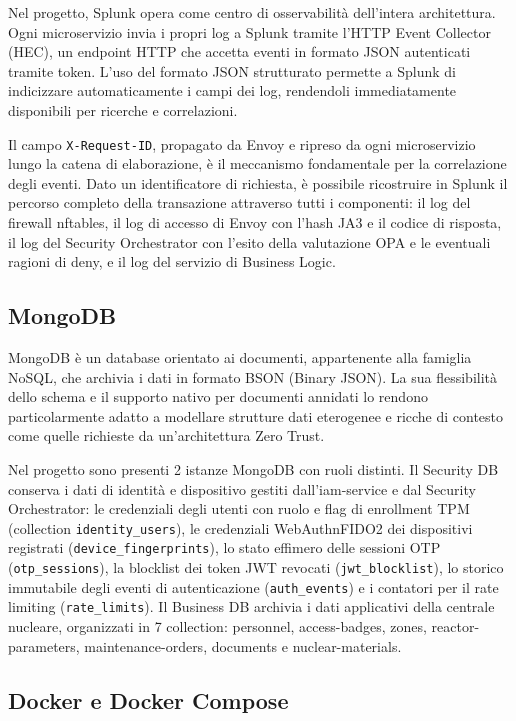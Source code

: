 Nel progetto, Splunk opera come centro di osservabilità dell'intera architettura. Ogni microservizio invia i propri log a Splunk tramite l'HTTP Event Collector (HEC), un endpoint HTTP che accetta eventi in formato JSON autenticati tramite token. L'uso del formato JSON strutturato permette a Splunk di indicizzare automaticamente i campi dei log, rendendoli immediatamente disponibili per ricerche e correlazioni.

Il campo \texttt{X-Request-ID}, propagato da Envoy e ripreso da ogni microservizio lungo la catena di elaborazione, è il meccanismo fondamentale per la correlazione degli eventi. Dato un identificatore di richiesta, è possibile ricostruire in Splunk il percorso completo della transazione attraverso tutti i componenti: il log del firewall nftables, il log di accesso di Envoy con l'hash JA3 e il codice di risposta, il log del Security Orchestrator con l'esito della valutazione OPA e le eventuali ragioni di deny, e il log del servizio di Business Logic.

\subsection{MongoDB}

MongoDB è un database orientato ai documenti, appartenente alla famiglia NoSQL, che archivia i dati in formato BSON (Binary JSON). La sua flessibilità dello schema e il supporto nativo per documenti annidati lo rendono particolarmente adatto a modellare strutture dati eterogenee e ricche di contesto come quelle richieste da un'architettura Zero Trust.

Nel progetto sono presenti 2 istanze MongoDB con ruoli distinti. Il Security DB conserva i
  dati di identità e dispositivo gestiti dall'iam-service e dal Security Orchestrator: le
  credenziali degli utenti con ruolo e flag di enrollment TPM (collection
  \texttt{identity\_users}), le credenziali WebAuthn\/FIDO2 dei dispositivi registrati
  (\texttt{device\_fingerprints}), lo stato effimero delle sessioni OTP
  (\texttt{otp\_sessions}), la blocklist dei token JWT revocati (\texttt{jwt\_blocklist}), lo
  storico immutabile degli eventi di autenticazione (\texttt{auth\_events}) e i contatori per il
  rate limiting (\texttt{rate\_limits}). Il Business DB archivia i dati applicativi della
  centrale nucleare, organizzati in 7 collection: personnel, access-badges, zones,
  reactor-parameters, maintenance-orders, documents e nuclear-materials.

\subsection{Docker e Docker Compose}

